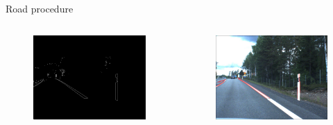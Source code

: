 \documentclass[12pt]{beamer}
\begin{document}
\begin{frame}{Road procedure}
\begin{columns}
{\begin{figure}
            \includegraphics[width=\textwidth]{resources/png/roadcanny.png}
        \end{figure}
        \vspace{-1.3em}
        \begin{figure}
            \includegraphics[width=\textwidth]{resources/png/roadhough.png}
        \end{figure}
    }
    \end{columns}
\end{frame}
\end{document}
